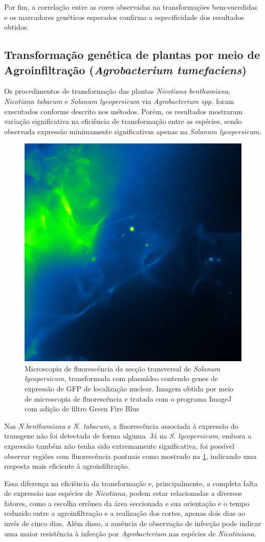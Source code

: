 Por fim, a correlação entre as cores observadas na transformações bem-sucedidas
e os marcadores genéticos esperados confirma a especificidade dos resultados
obtidos.

\subsection{Transformação genética de plantas por meio de Agroinfiltração (\textit{Agrobacterium tumefaciens})}
Os procedimentos de transformação das plantas \textit{Nicotiana benthamiana},
\textit{Nicotiana tabacum} e \textit{Solanum lycopersicum} via
\textit{Agrobacterium spp.} foram executados conforme descrito nos métodos.
Porém, os resultados mostraram variação significativa na eficiência de
transformação entre as espécies, sendo observada expressão minimamente
significativas apenas na \textit{Solanum lycopersicum}. 

\begin{figure}
	\centering
	\includegraphics[width=.30\textwidth]{fig/tomate.png}
	\caption{Microscopia de fluorescência da secção transversal de \textit{Solanum lycopersicum}, transformada com plasmídeo contendo genes de expressão de GFP de localização nuclear. Imagem obtida por meio de microscopia de fluorescência e tratada com o programa ImageJ com adição de filtro Green Fire Blue}
	\label{lyco}
\end{figure}

Nas \textit{N.benthamiana} e \textit{N. tabacum}, a fluorescência associada á expressão do
transgene não foi detectada de forma alguma. Já na \textit{S.  lycopersicum},
embora a expressão também não tenha sido extremamente significativa, foi
possível observar regiões com fluorescência pontuais como mostrado na
\cref{lyco}, indicando uma resposta mais eficiente à agroinfiltração.

Essa diferença na eficiência da transformação e, principalmente, a completa
falta de expressão nas espécies de \textit{Nicotiana}, podem estar relacionadas a
diversos fatores, como a escolha errônea da área seccionada e sua orientação e o
tempo reduzido entre a agroinfiltração e a realização dos cortes, apenas dois
dias ao invés de cinco dias. Além disso, a ausência de observação de infecção pode indicar uma maior resistência à infecção
por \textit{Agrobacterium} nas espécies de \textit{Nicotiniana}.

